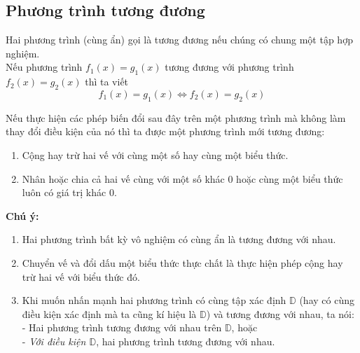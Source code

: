 \subsection{Phương trình tương đương}
\begin{dn}
Hai phương trình (cùng ẩn) gọi là tương đương nếu chúng có chung một tập hợp nghiệm.\\
Nếu phương trình $f_1(x)=g_1(x)$ tương đương với phương trình  $f_2(x)=g_2(x)$ thì ta viết
\[
f_1(x)=g_1(x)\Leftrightarrow f_2(x)=g_2(x)
\]
\end{dn}
\begin{dl}
Nếu thực hiện các phép biến đổi sau đây trên một phương trình mà không làm thay đổi điều kiện của nó thì ta được một phương trình mới tương đương: 
\begin{enumerate}
\item Cộng hay trừ hai vế với cùng một số hay cùng một biểu thức. 
\item Nhân hoặc chia cả hai vế cùng với một số khác $0$ hoặc cùng một biểu thức luôn có giá trị khác $0$.
\end{enumerate}
\end{dl}
\begin{note}\textbf{Chú ý:}
\begin{enumerate}
\item Hai phương trình bất kỳ vô nghiệm có cùng ẩn là tương đương với nhau.
\item Chuyển vế và đổi dấu một biểu thức thực chất là thực hiện phép cộng hay trừ hai vế với biểu thức đó.
\item Khi muốn nhấn mạnh hai phương trình có cùng tập xác định $\mathbb{D}$ (hay có cùng điều kiện xác định mà ta cũng kí hiệu là $\mathbb{D}$) và tương đương với nhau, ta nói: \\
- Hai phương trình tương đương với nhau trên $\mathbb{D}$, hoặc \\
- \textit{Với điều kiện $\mathbb{D}$}, hai phương trình tương đương với nhau.
\end{enumerate}

\end{note}
